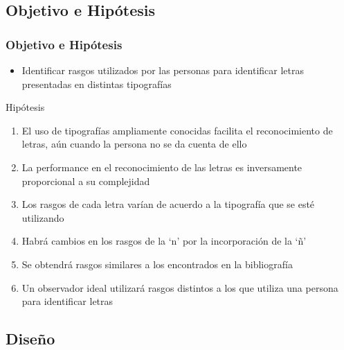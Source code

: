 \documentclass[10pt]{beamer}
\begin{document}
  \subsection{Objetivo e Hip\'otesis}
      \begin{frame}
	\frametitle{Objetivo e Hip\'otesis}
	\begin{itemize}
		\item Identificar rasgos utilizados por las personas para identificar letras presentadas en distintas tipograf\'ias
      \end{itemize}	\pause
      \begin{block}{Hip\'otesis}
	  \begin{enumerate}
		\item\alert<3>{El uso de tipograf\'ias ampliamente conocidas facilita el reconocimiento de letras, aún cuando la persona no se da cuenta de ello}
		\item\alert<3>{La performance en el reconocimiento de las letras es inversamente proporcional a su complejidad}
		\item\alert<4>{Los rasgos de cada letra var\'ian de acuerdo a la tipograf\'ia que se est\'e utilizando}
		\item\alert<4>{Habrá cambios en los rasgos de la `n' por la incorporación de la `ñ'}
		\item\alert<4>{Se obtendrá rasgos similares a los encontrados en la bibliografía}
		\item\alert<4>{Un observador ideal utilizar\'a rasgos distintos a los que utiliza una persona para identificar letras}
	  \end{enumerate}
      \end{block}

      \end{frame}
  \subsection{Dise\~no}
\end{document}
